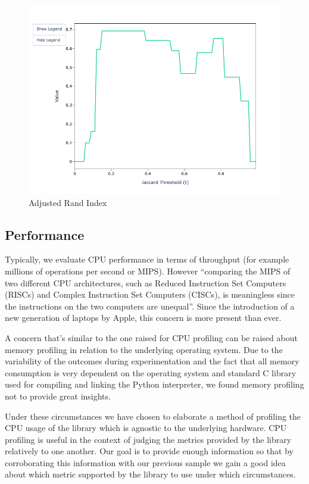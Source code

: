 \documentclass[a4paper,twoside]{article}
\begin{document}
\begin{figure}[!ht]
\begin{minipage}{0.32\textwidth}
            \includegraphics[width=\textwidth]{sample-usage/mini-alg-ari}
            \caption{Adjusted Rand Index}
        \end{minipage}
    \end{figure}

    \subsection{Performance}

    Typically, we evaluate CPU performance in terms of throughput (for example
    millions of operations per second or MIPS).
    However ``comparing the MIPS of two different CPU architectures, such as
    Reduced Instruction Set Computers (RISCs) and Complex Instruction Set
    Computers (CISCs), is meaningless since the instructions on the two
    computers are unequal''\cite{jain1991profiling}.
    Since the introduction of a new generation of laptops by Apple, this concern
    is more present than ever.

    A concern that's similar to the one raised for CPU profiling can be raised
    about memory profiling in relation to the underlying operating system.
    Due to the variability of the outcomes during experimentation and the fact
    that all memory consumption is very dependent on the operating system and
    standard C library used for compiling and linking the Python interpreter,
    we found memory profiling not to provide great insights.

    Under these circumstances we have chosen to elaborate a method of profiling
    the CPU usage of the library which is agnostic to the underlying hardware.
    CPU profiling is useful in the context of judging the metrics provided by
    the library relatively to one another.
    Our goal is to provide enough information so that by corroborating this
    information with our previous sample we gain a good idea about which metric
    supported by the library to use under which circumstances.
    
\end{document}
